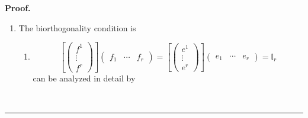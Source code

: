 \documentclass[aps,preprint]{revtex4}
\newenvironment{proof}[1][Proof]{\noindent\textbf{#1.} }{\ \rule{0.5em}{0.5em}}
\begin{document}
\begin{proof}
\begin{enumerate}
\item The biorthogonality condition is \label{biorthogonality condition}

\begin{enumerate}
\item 
\begin{equation}
\left[ \left( 
\begin{array}{c}
f^{1} \\ 
\vdots \\ 
f^{r}%
\end{array}%
\right) \right] \left( 
\begin{array}{ccc}
f_{1} & \cdots & f_{r}%
\end{array}%
\right) =\left[ \left( 
\begin{array}{c}
e^{1} \\ 
\vdots \\ 
e^{r}%
\end{array}%
\right) \right] \left( 
\begin{array}{ccc}
e_{1} & \cdots & e_{r}%
\end{array}%
\right) =\mathbb{I}_{r}
\end{equation}%
can be analyzed in detail by


\end{enumerate}
\end{enumerate}
\end{proof}
\end{document}
